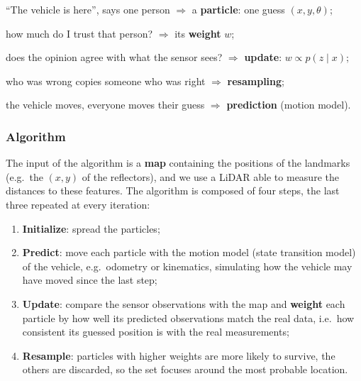 \begin{examplebox}
\begin{compactitemize}
    \item ``The vehicle is here'', says one person $\Rightarrow$ a \textbf{particle}: one guess $(x, y, \theta)$;
    \item how much do I trust that person? $\Rightarrow$ its \textbf{weight} $w$;
    \item does the opinion agree with what the sensor sees? $\Rightarrow$ \textbf{update}: $w \propto p(z \mid x)$;
    \item who was wrong copies someone who was right $\Rightarrow$ \textbf{resampling};
    \item the vehicle moves, everyone moves their guess $\Rightarrow$ \textbf{prediction} (motion model).
\end{compactitemize}
\end{examplebox}

\subsubsection{Algorithm}
The input of the algorithm is a \textbf{map} containing the positions of the landmarks (e.g.\ the $(x, y)$ of the reflectors), and we use a LiDAR able to measure the distances to these features.
The algorithm is composed of four steps, the last three repeated at every iteration:
\begin{enumerate}
    \item \textbf{Initialize}: spread the particles;
    \item \textbf{Predict}: move each particle with the motion model (state transition model) of the vehicle, e.g.\ odometry or kinematics, simulating how the vehicle may have moved since the last step;
    \item \textbf{Update}: compare the sensor observations with the map and \textbf{weight} each particle by how well its predicted observations match the real data, i.e.\ how consistent its guessed position is with the real measurements;
    \item \textbf{Resample}: particles with higher weights are more likely to survive, the others are discarded, so the set focuses around the most probable location.
\end{enumerate}

